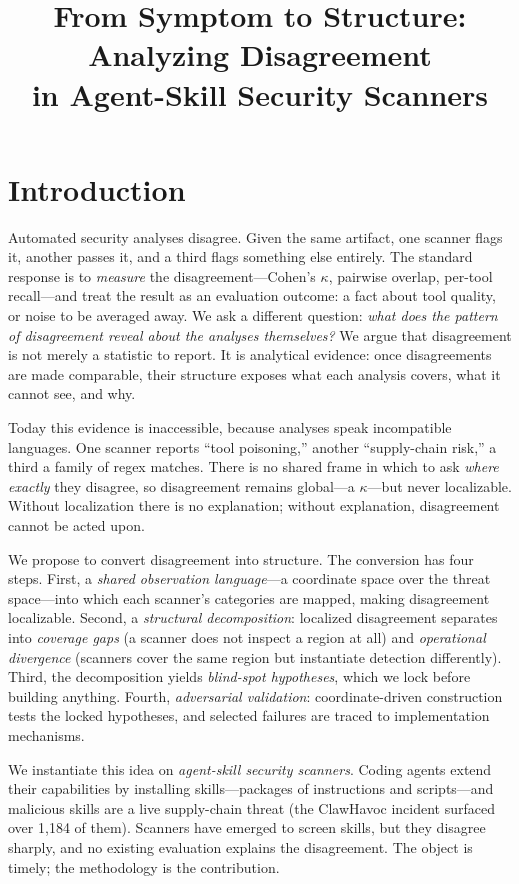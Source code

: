 \documentclass[sigconf,nonacm]{acmart}
\title{From Symptom to Structure: Analyzing Disagreement\\in Agent-Skill Security Scanners}
\begin{document}
\maketitle

\section{Introduction}
\label{sec:intro}

Automated security analyses disagree.
Given the same artifact, one scanner flags it, another passes it, and a third flags something else entirely.
The standard response is to \emph{measure} the disagreement---Cohen's $\kappa$, pairwise overlap, per-tool recall---and treat the result as an evaluation outcome: a fact about tool quality, or noise to be averaged away.
We ask a different question: \emph{what does the pattern of disagreement reveal about the analyses themselves?}
We argue that disagreement is not merely a statistic to report.
It is analytical evidence: once disagreements are made comparable, their structure exposes what each analysis covers, what it cannot see, and why.

Today this evidence is inaccessible, because analyses speak incompatible languages.
One scanner reports ``tool poisoning,'' another ``supply-chain risk,'' a third a family of regex matches.
There is no shared frame in which to ask \emph{where exactly} they disagree, so disagreement remains global---a $\kappa$---but never localizable.
Without localization there is no explanation; without explanation, disagreement cannot be acted upon.

We propose to convert disagreement into structure.
The conversion has four steps.
First, a \emph{shared observation language}---a coordinate space over the threat space---into which each scanner's categories are mapped, making disagreement localizable.
Second, a \emph{structural decomposition}: localized disagreement separates into \emph{coverage gaps} (a scanner does not inspect a region at all) and \emph{operational divergence} (scanners cover the same region but instantiate detection differently).
Third, the decomposition yields \emph{blind-spot hypotheses}, which we lock before building anything.
Fourth, \emph{adversarial validation}: coordinate-driven construction tests the locked hypotheses, and selected failures are traced to implementation mechanisms.

We instantiate this idea on \emph{agent-skill security scanners}.
Coding agents extend their capabilities by installing skills---packages of instructions and scripts---and malicious skills are a live supply-chain threat (the ClawHavoc incident surfaced over 1{,}184 of them).
Scanners have emerged to screen skills, but they disagree sharply, and no existing evaluation explains the disagreement.
The object is timely; the methodology is the contribution.
\end{document}
